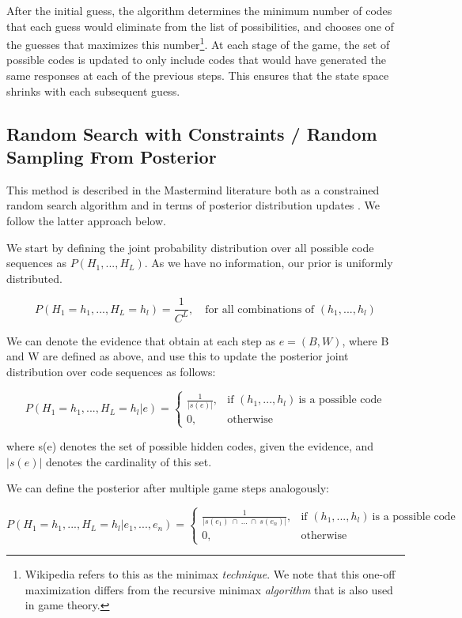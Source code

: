 \documentclass[11pt]{article}
\begin{document}
After the initial guess, the algorithm determines the minimum number of codes that each guess would eliminate from the list of possibilities, and chooses one of the guesses that maximizes this number\footnote{Wikipedia refers to this as the minimax \textit{technique}. We note that this one-off maximization differs from the recursive minimax \textit{algorithm} that is also used in game theory.}. At each stage of the game, the set of possible codes is updated to only include codes that would have generated the same responses at each of the previous steps. This ensures that the state space shrinks with each subsequent guess.

\subsection{Random Search with Constraints / Random Sampling From Posterior}

This method is described in the Mastermind literature both as a constrained random search algorithm \cite{bernier1996solving} and in terms of posterior distribution updates \cite{vomlel2004bayesian}. We follow the latter approach below.

We start by defining the joint probability distribution over all possible code sequences as $P(H_1, ..., H_L)$. As we have no information, our prior is uniformly distributed.

\[
P(H_1=h_1, ..., H_L=h_l) = \frac{1}{C^L} ,\quad \text{for all combinations of }(h_1, ..., h_l)
\]

\noindent We can denote the evidence that obtain at each step as $e = (B, W)$, where B and W are defined as above, and use this to update the posterior joint distribution over code sequences as follows:

\[
    P(H_1=h_1, ..., H_L=h_l | e) = 
\begin{cases}
    \frac{1}{|s(e)|},& \text{if } (h_1, ..., h_l) \ \text{is a possible code}\\
    0,              & \text{otherwise}
\end{cases}
\]

\noindent where s(e) denotes the set of possible hidden codes, given the evidence, and $|s(e)|$ denotes the cardinality of this set. \medskip

\noindent We can define the posterior after multiple game steps analogously:

\[
    P(H_1=h_1, ..., H_L=h_l | e_1, ..., e_n) = 
\begin{cases}
    \frac{1}{| s(e_1) \ \cap \ ... \ \cap \ s(e_n) |},& \text{if } (h_1, ..., h_l) \ \text{is a possible code}\\
    0,              & \text{otherwise}
\end{cases}
\]
\end{document}
